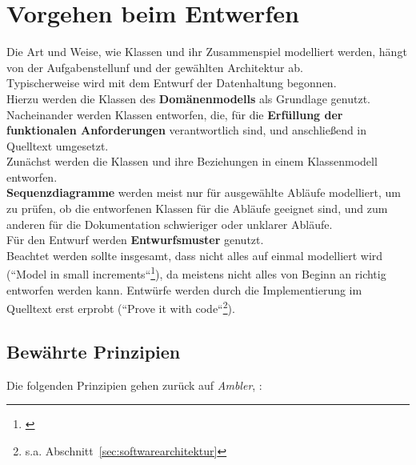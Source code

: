 \section{Vorgehen beim Entwerfen}\label{sec:vorgehen-beim-entwerfen}
Die Art und Weise, wie Klassen und ihr Zusammenspiel modelliert werden, hängt von der Aufgabenstellunf und der gewählten Architektur ab.\\

\noindent
Typischerweise wird mit dem Entwurf der Datenhaltung begonnen.\\
Hierzu werden die Klassen des \textbf{Domänenmodells} als Grundlage genutzt.\\

\noindent
Nacheinander werden Klassen entworfen, die, für die \textbf{Erfüllung der funktionalen Anforderungen} verantwortlich sind, und anschließend in Quelltext umgesetzt.\\

\noindent
Zunächst werden die Klassen und ihre Beziehungen in einem Klassenmodell entworfen.\\

\noindent
\textbf{Sequenzdiagramme} werden meist nur für ausgewählte Abläufe modelliert, um zu prüfen, ob die entworfenen Klassen für die Abläufe geeignet sind, und zum anderen für die Dokumentation schwieriger oder unklarer Abläufe.\\

\noindent
Für den Entwurf werden \textbf{Entwurfsmuster} genutzt.\\

\noindent
Beachtet werden sollte insgesamt, dass nicht alles auf einmal modelliert wird (``Model in small increments``\footnote{\cite[51]{Wed09b}}), da meistens nicht alles von Beginn an richtig entworfen werden kann.
Entwürfe werden durch die Implementierung im Quelltext erst erprobt (``Prove it with code``\footnote{
    s.a. Abschnitt~\ref{sec:softwarearchitektur}
}).

\subsection*{Bewährte Prinzipien}

Die folgenden Prinzipien gehen zurück auf \textit{Ambler}, \cite[112, Table 4.2. The Supplementary Principles of AM]{Amb04}:


